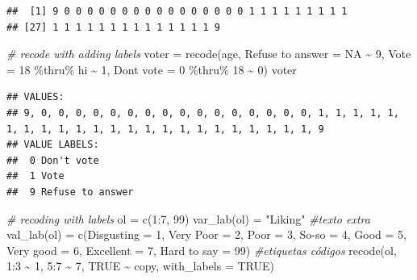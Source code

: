 \documentclass[
]{book}
\newenvironment{Shaded}{\begin{snugshade}}{\end{snugshade}}
\newcommand{\AttributeTok}[1]{\textcolor[rgb]{0.77,0.63,0.00}{#1}}
\newcommand{\CommentTok}[1]{\textcolor[rgb]{0.56,0.35,0.01}{\textit{#1}}}
\newcommand{\ConstantTok}[1]{\textcolor[rgb]{0.00,0.00,0.00}{#1}}
\newcommand{\DecValTok}[1]{\textcolor[rgb]{0.00,0.00,0.81}{#1}}
\newcommand{\FunctionTok}[1]{\textcolor[rgb]{0.00,0.00,0.00}{#1}}
\newcommand{\NormalTok}[1]{#1}
\newcommand{\OtherTok}[1]{\textcolor[rgb]{0.56,0.35,0.01}{#1}}
\newcommand{\SpecialCharTok}[1]{\textcolor[rgb]{0.00,0.00,0.00}{#1}}
\newcommand{\StringTok}[1]{\textcolor[rgb]{0.31,0.60,0.02}{#1}}
\begin{document}
\begin{verbatim}
##  [1] 9 0 0 0 0 0 0 0 0 0 0 0 0 0 0 0 0 1 1 1 1 1 1 1 1 1
## [27] 1 1 1 1 1 1 1 1 1 1 1 1 1 1 9
\end{verbatim}

\begin{Shaded}
\begin{Highlighting}[]
\CommentTok{\# recode with adding labels}
\NormalTok{voter }\OtherTok{=} \FunctionTok{recode}\NormalTok{(age, }\StringTok{\textasciigrave{}}\AttributeTok{Refuse to answer}\StringTok{\textasciigrave{}} \OtherTok{=} \ConstantTok{NA} \SpecialCharTok{\textasciitilde{}} \DecValTok{9}\NormalTok{, }\AttributeTok{Vote =} \DecValTok{18} \SpecialCharTok{\%thru\%}
\NormalTok{  hi }\SpecialCharTok{\textasciitilde{}} \DecValTok{1}\NormalTok{, }\StringTok{\textasciigrave{}}\AttributeTok{Don\textquotesingle{}t vote}\StringTok{\textasciigrave{}} \OtherTok{=} \DecValTok{0} \SpecialCharTok{\%thru\%} \DecValTok{18} \SpecialCharTok{\textasciitilde{}} \DecValTok{0}\NormalTok{)}
\NormalTok{voter}
\end{Highlighting}
\end{Shaded}

\begin{verbatim}
## VALUES:
## 9, 0, 0, 0, 0, 0, 0, 0, 0, 0, 0, 0, 0, 0, 0, 0, 0, 1, 1, 1, 1, 1, 1, 1, 1, 1, 1, 1, 1, 1, 1, 1, 1, 1, 1, 1, 1, 1, 1, 1, 9
## VALUE LABELS:                   
##  0 Don't vote      
##  1 Vote            
##  9 Refuse to answer
\end{verbatim}

\begin{Shaded}
\begin{Highlighting}[]
\CommentTok{\# recoding with labels}
\NormalTok{ol }\OtherTok{=} \FunctionTok{c}\NormalTok{(}\DecValTok{1}\SpecialCharTok{:}\DecValTok{7}\NormalTok{, }\DecValTok{99}\NormalTok{)}
\FunctionTok{var\_lab}\NormalTok{(ol) }\OtherTok{=} \StringTok{"Liking"}  \CommentTok{\#texto extra}
\FunctionTok{val\_lab}\NormalTok{(ol) }\OtherTok{=} \FunctionTok{c}\NormalTok{(}\AttributeTok{Disgusting =} \DecValTok{1}\NormalTok{, }\StringTok{\textasciigrave{}}\AttributeTok{Very Poor}\StringTok{\textasciigrave{}} \OtherTok{=} \DecValTok{2}\NormalTok{, }\AttributeTok{Poor =} \DecValTok{3}\NormalTok{,}
  \StringTok{\textasciigrave{}}\AttributeTok{So{-}so}\StringTok{\textasciigrave{}} \OtherTok{=} \DecValTok{4}\NormalTok{, }\AttributeTok{Good =} \DecValTok{5}\NormalTok{, }\StringTok{\textasciigrave{}}\AttributeTok{Very good}\StringTok{\textasciigrave{}} \OtherTok{=} \DecValTok{6}\NormalTok{, }\AttributeTok{Excellent =} \DecValTok{7}\NormalTok{,}
  \StringTok{\textasciigrave{}}\AttributeTok{Hard to say}\StringTok{\textasciigrave{}} \OtherTok{=} \DecValTok{99}\NormalTok{)  }\CommentTok{\#etiquetas códigos}
\FunctionTok{recode}\NormalTok{(ol, }\DecValTok{1}\SpecialCharTok{:}\DecValTok{3} \SpecialCharTok{\textasciitilde{}} \DecValTok{1}\NormalTok{, }\DecValTok{5}\SpecialCharTok{:}\DecValTok{7} \SpecialCharTok{\textasciitilde{}} \DecValTok{7}\NormalTok{, }\ConstantTok{TRUE} \SpecialCharTok{\textasciitilde{}}\NormalTok{ copy, }\AttributeTok{with\_labels =} \ConstantTok{TRUE}\NormalTok{)}
\end{Highlighting}
\end{Shaded}
\end{document}
